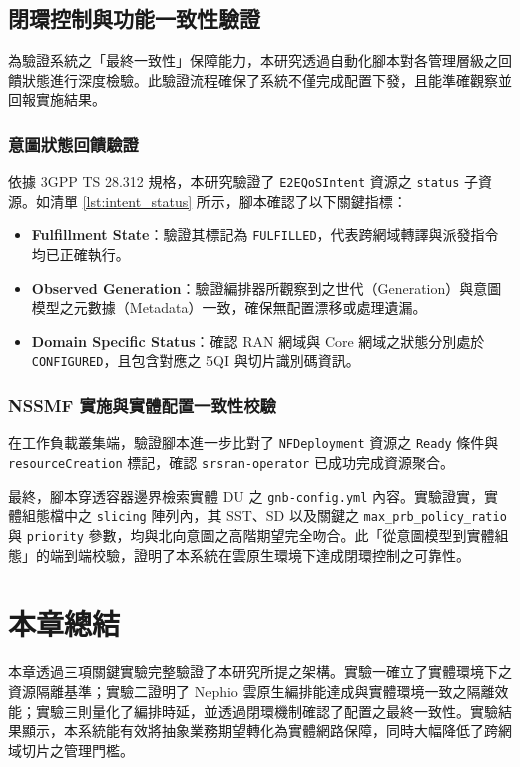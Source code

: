 \subsection{閉環控制與功能一致性驗證}
\label{subsec:closed_loop_validation}

為驗證系統之「最終一致性」保障能力，本研究透過自動化腳本對各管理層級之回饋狀態進行深度檢驗。此驗證流程確保了系統不僅完成配置下發，且能準確觀察並回報實施結果。

\subsubsection{意圖狀態回饋驗證}
依據 3GPP TS 28.312 規格，本研究驗證了 \texttt{E2EQoSIntent} 資源之 \texttt{status} 子資源。如清單 \ref{lst:intent_status} 所示，腳本確認了以下關鍵指標：
\begin{itemize}
    \item \textbf{Fulfillment State}：驗證其標記為 \texttt{FULFILLED}，代表跨網域轉譯與派發指令均已正確執行。
    \item \textbf{Observed Generation}：驗證編排器所觀察到之世代（Generation）與意圖模型之元數據（Metadata）一致，確保無配置漂移或處理遺漏。
    \item \textbf{Domain Specific Status}：確認 RAN 網域與 Core 網域之狀態分別處於 \texttt{CONFIGURED}，且包含對應之 5QI 與切片識別碼資訊。
\end{itemize}

\subsubsection{NSSMF 實施與實體配置一致性校驗}
在工作負載叢集端，驗證腳本進一步比對了 \texttt{NFDeployment} 資源之 \texttt{Ready} 條件與 \texttt{resourceCreation} 標記，確認 \texttt{srsran-operator} 已成功完成資源聚合。

最終，腳本穿透容器邊界檢索實體 DU 之 \texttt{gnb-config.yml} 內容。實驗證實，實體組態檔中之 \texttt{slicing} 陣列內，其 SST、SD 以及關鍵之 \texttt{max\_prb\_policy\_ratio} 與 \texttt{priority} 參數，均與北向意圖之高階期望完全吻合。此「從意圖模型到實體組態」的端到端校驗，證明了本系統在雲原生環境下達成閉環控制之可靠性。

\section{本章總結}
\label{sec:chapter_summary}

本章透過三項關鍵實驗完整驗證了本研究所提之架構。實驗一確立了實體環境下之資源隔離基準；實驗二證明了 Nephio 雲原生編排能達成與實體環境一致之隔離效能；實驗三則量化了編排時延，並透過閉環機制確認了配置之最終一致性。實驗結果顯示，本系統能有效將抽象業務期望轉化為實體網路保障，同時大幅降低了跨網域切片之管理門檻。
